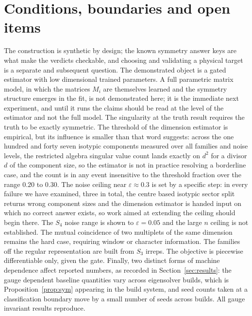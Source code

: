 \documentclass[11pt]{article}
\begin{document}
\section{Conditions, boundaries and open items}
The construction is synthetic by design; the known symmetry answer keys are what
make the verdicts checkable, and choosing and validating a physical target is a
separate and subsequent question. The demonstrated object is a gated estimator
with low dimensional trained parameters. A full parametric matrix model, in which
the matrices $M_i$ are themselves learned and the symmetry structure emerges in
the fit, is not demonstrated here; it is the immediate next experiment, and until
it runs the claims should be read at the level of the estimator and not the full
model. The singularity at the truth result requires the truth to be exactly
symmetric. The threshold of the dimension estimator is empirical, but its
influence is smaller than that word suggests: across the one hundred and forty
seven isotypic components measured over all families and noise levels, the
restricted algebra singular value count lands exactly on $d^2$ for a divisor $d$
of the component size, so the estimator is not in practice resolving a borderline
case, and the count is in any event insensitive to the threshold fraction over
the range $0.20$ to $0.30$. The noise ceiling near $\varepsilon\approx0.3$ is set
by a specific step: in every failure we have examined, three in total, the centre
based isotypic sector split returns wrong component sizes and the dimension
estimator is handed input on which no correct answer exists, so work aimed at
extending the ceiling should begin there. The $S_4$ noise range is shown to
$\varepsilon=0.05$ and the large $n$ ceiling is not established. The mutual
coincidence of two multiplets of the same dimension remains the hard case,
requiring window or character information. The families off the regular
representation are built from $S_3$ irreps. The objective is piecewise
differentiable only, given the gate. Finally, two distinct forms of machine
dependence affect reported numbers, as recorded in Section~\ref{sec:results}: the
gauge dependent baseline quantities vary across eigensolver builds, which is
Proposition~\ref{prop:sym} appearing in the build system, and seed counts taken
at a classification boundary move by a small number of seeds across builds. All
gauge invariant results reproduce.
\end{document}

